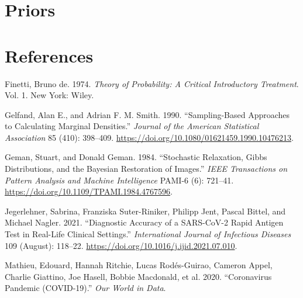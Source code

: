 \documentclass[
  11pt,
  letterpaper,
]{scrbook}
\newlength{\cslhangindent}
\newlength{\cslentryspacingunit} %
\newenvironment{CSLReferences}[2] %
 {%
  \setlength{\parindent}{0pt}
  \ifodd #1
  \let\oldpar\par
  \def\par{\hangindent=\cslhangindent\oldpar}
  \fi
  \setlength{\parskip}{#2\cslentryspacingunit}
 }%
 {}
\theoremstyle{definition}
\theoremstyle{remark}
\begin{document}

\hypertarget{priors}{%
\chapter{Priors}\label{priors}}


\hypertarget{references}{%
\chapter*{References}\label{references}}


\hypertarget{refs}{}
\begin{CSLReferences}{1}{0}
\leavevmode{}%
Finetti, Bruno de. 1974. \emph{Theory of Probability: A Critical
Introductory Treatment}. Vol. 1. New York: Wiley.

\leavevmode{}%
Gelfand, Alan E., and Adrian F. M. Smith. 1990. {``Sampling-Based
Approaches to Calculating Marginal Densities.''} \emph{Journal of the
American Statistical Association} 85 (410): 398--409.
\url{https://doi.org/10.1080/01621459.1990.10476213}.

\leavevmode{}%
Geman, Stuart, and Donald Geman. 1984. {``Stochastic Relaxation, {G}ibbs
Distributions, and the {B}ayesian Restoration of Images.''} \emph{IEEE
Transactions on Pattern Analysis and Machine Intelligence} PAMI-6 (6):
721--41. \url{https://doi.org/10.1109/TPAMI.1984.4767596}.

\leavevmode{}%
Jegerlehner, Sabrina, Franziska Suter-Riniker, Philipp Jent, Pascal
Bittel, and Michael Nagler. 2021. {``Diagnostic Accuracy of a
{SARS-CoV-2} Rapid Antigen Test in Real-Life Clinical Settings.''}
\emph{International Journal of Infectious Diseases} 109 (August):
118--22. \url{https://doi.org/10.1016/j.ijid.2021.07.010}.

\leavevmode{}%
Mathieu, Edouard, Hannah Ritchie, Lucas Rodés-Guirao, Cameron Appel,
Charlie Giattino, Joe Hasell, Bobbie Macdonald, et al. 2020.
{``Coronavirus Pandemic (COVID-19).''} \emph{Our World in Data}.

\end{CSLReferences}


\backmatter
\end{document}
